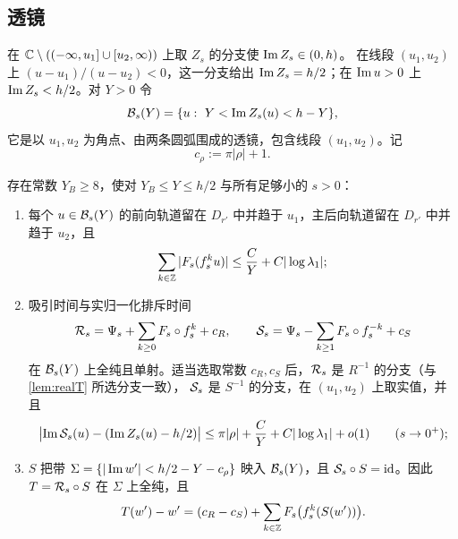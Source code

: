 \subsection{透镜}

在 $\mathbb{C}\setminus((-\infty,u_1]\cup[u_2,\infty))$ 上取 $Z_s$ 的分支使 $\operatorname{Im} Z_s\in(0,h)$。
在线段 $(u_1,u_2)$ 上 $(u-u_1)/(u-u_2)<0$，这一分支给出 $\operatorname{Im} Z_s=h/2$；在 $\operatorname{Im} u>0$ 上 $\operatorname{Im} Z_s<h/2$。对 $Y>0$ 令
\[
 \mathcal B_s(Y)=\{u:\ Y<\operatorname{Im} Z_s(u)<h-Y\},
\]
它是以 $u_1,u_2$ 为角点、由两条圆弧围成的透镜，包含线段 $(u_1,u_2)$。记
\[
 c_\rho:=\pi|\rho|+1 .
\]

\begin{lemma}[透镜]\label{ch6:lem:band}
存在常数 $Y_B\ge8$，使对 $Y_B\le Y\le h/2$ 与所有足够小的 $s>0$：
\begin{enumerate}
\item 每个 $u\in\mathcal B_s(Y)$ 的前向轨道留在 $D_{r'}$ 中并趋于 $u_1$，主后向轨道留在 $D_{r'}$ 中并趋于 $u_2$，且
 \[
  \sum_{k\in\mathbb{Z}}|F_s(f_s^ku)|\le\frac CY+C|\log\lambda_1| ;
 \]
\item 吸引时间与实归一化排斥时间
 \[
  \mathcal R_s=\Psi_s+\sum_{k\ge0}F_s\circ f_s^k+c_R,\qquad \mathcal S_s=\Psi_s-\sum_{k\ge1}F_s\circ f_s^{-k}+c_S
 \]
 在 $\mathcal B_s(Y)$ 上全纯且单射。适当选取常数 $c_R,c_S$ 后，$\mathcal R_s$ 是 $R^{-1}$ 的分支（与 \cref{lem:realT} 所选分支一致），
 $\mathcal S_s$ 是 $S^{-1}$ 的分支，在 $(u_1,u_2)$ 上取实值，并且
 \begin{equation}\label{ch6:eq:ImS}
  \bigl|\operatorname{Im}\mathcal S_s(u)-(\operatorname{Im} Z_s(u)-h/2)\bigr|\le\pi|\rho|+\frac CY+C|\log\lambda_1|+o(1)\qquad(s\to0^+);
 \end{equation}
\item $S$ 把带 $\Sigma=\{|\operatorname{Im} w'|<h/2-Y-c_\rho\}$ 映入 $\mathcal B_s(Y)$，且 $\mathcal S_s\circ S=\mathrm{id}$。因此 $T=\mathcal R_s\circ S$ 在 $\Sigma$ 上全纯，且
 \begin{equation}\label{ch6:eq:Tsum}
  T(w')-w'=(c_R-c_S)+\sum_{k\in\mathbb{Z}}F_s\bigl(f_s^k(S(w'))\bigr).
 \end{equation}
\end{enumerate}
\end{lemma}

